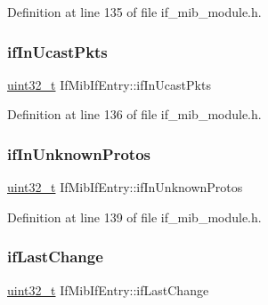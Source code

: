 Definition at line 135 of file if\+\_\+mib\+\_\+module.\+h.

\mbox{\label{structIfMibIfEntry_a7e9081beb20cde7e344ad3002afcc769}} 
\subsubsection{\texorpdfstring{if\+In\+Ucast\+Pkts}{ifInUcastPkts}}
{\footnotesize\ttfamily \hyperlink{stdint_8h_a435d1572bf3f880d55459d9805097f62}{uint32\+\_\+t} If\+Mib\+If\+Entry\+::if\+In\+Ucast\+Pkts}



Definition at line 136 of file if\+\_\+mib\+\_\+module.\+h.

\mbox{\label{structIfMibIfEntry_a07ee897158eb93cfb25512c6eff13369}} 
\subsubsection{\texorpdfstring{if\+In\+Unknown\+Protos}{ifInUnknownProtos}}
{\footnotesize\ttfamily \hyperlink{stdint_8h_a435d1572bf3f880d55459d9805097f62}{uint32\+\_\+t} If\+Mib\+If\+Entry\+::if\+In\+Unknown\+Protos}



Definition at line 139 of file if\+\_\+mib\+\_\+module.\+h.

\mbox{\label{structIfMibIfEntry_a3f8edc50f37f29cbbfb4664010df7ba9}} 
\subsubsection{\texorpdfstring{if\+Last\+Change}{ifLastChange}}
{\footnotesize\ttfamily \hyperlink{stdint_8h_a435d1572bf3f880d55459d9805097f62}{uint32\+\_\+t} If\+Mib\+If\+Entry\+::if\+Last\+Change}



